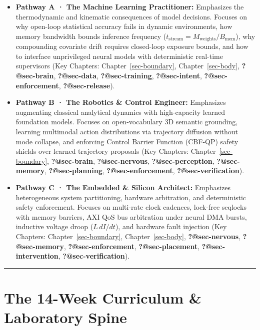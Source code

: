 \documentclass[
  9pt,
  letterpaper,
  open=right,
  numbers=noenddot,
  captions=tableheading]{scrbook}
\makeatletter
\providecommand{\tightlist}{%
  \setlength{\itemsep}{0pt}\setlength{\parskip}{0pt}}
\def\tightlist{}
\let\tightlist\relax
\newif\ifmlsys@inside@longtable
\newif\ifmlsys@longtable@numbered
\let\mlsys@orig@label\label
\renewcommand{\label}[1]{%
  \ifmlsys@inside@longtable
    \global\mlsys@longtable@numberedtrue
  \fi
  \mlsys@orig@label{#1}%
}
\let\label\mlsys@orig@label
\makeatother
\begin{document}
\begin{itemize}
\tightlist
\item
  \textbf{Pathway A · The Machine Learning Practitioner:} Emphasizes the
  thermodynamic and kinematic consequences of model decisions. Focuses
  on why open-loop statistical accuracy fails in dynamic environments,
  how memory bandwidth bounds inference frequency
  (\(t_{\text{stream}} = M_{\text{weights}} / B_{\text{mem}}\)), why
  compounding covariate drift requires closed-loop exposure bounds, and
  how to interface unprivileged neural models with deterministic
  real-time supervisors (Key Chapters: Chapter~\ref{sec-boundary},
  Chapter~\ref{sec-body}, \textbf{?@sec-brain}, \textbf{?@sec-data},
  \textbf{?@sec-training}, \textbf{?@sec-intent},
  \textbf{?@sec-enforcement}, \textbf{?@sec-release}).
\item
  \textbf{Pathway B · The Robotics \& Control Engineer:} Emphasizes
  augmenting classical analytical dynamics with high-capacity learned
  foundation models. Focuses on open-vocabulary 3D semantic grounding,
  learning multimodal action distributions via trajectory diffusion
  without mode collapse, and enforcing Control Barrier Function (CBF-QP)
  safety shields over learned trajectory proposals (Key Chapters:
  Chapter~\ref{sec-boundary}, \textbf{?@sec-brain},
  \textbf{?@sec-nervous}, \textbf{?@sec-perception},
  \textbf{?@sec-memory}, \textbf{?@sec-planning},
  \textbf{?@sec-enforcement}, \textbf{?@sec-verification}).
\item
  \textbf{Pathway C · The Embedded \& Silicon Architect:} Emphasizes
  heterogeneous system partitioning, hardware arbitration, and
  deterministic safety enforcement. Focuses on multi-rate clock
  cadences, lock-free seqlocks with memory barriers, AXI QoS bus
  arbitration under neural DMA bursts, inductive voltage droop
  (\(L \, dI/dt\)), and hardware fault injection (Key Chapters:
  Chapter~\ref{sec-boundary}, Chapter~\ref{sec-body},
  \textbf{?@sec-nervous}, \textbf{?@sec-memory},
  \textbf{?@sec-enforcement}, \textbf{?@sec-placement},
  \textbf{?@sec-intervention}, \textbf{?@sec-verification}).
\end{itemize}

\begin{center}\rule{0.5\linewidth}{0.5pt}\end{center}

\section*{The 14-Week Curriculum \& Laboratory
Spine}\label{the-14-week-curriculum-laboratory-spine}
\end{document}
